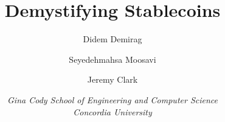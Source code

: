 \documentclass[letterpaper]{article}
\begin{document}
\title{Demystifying Stablecoins}
\author{Didem Demirag \and Seyedehmahsa Moosavi \and Jeremy Clark}
\date{\textit{Gina Cody School of Engineering and Computer Science\\Concordia University}}
\maketitle


\begin{abstract}

\end{abstract}










\end{document}
